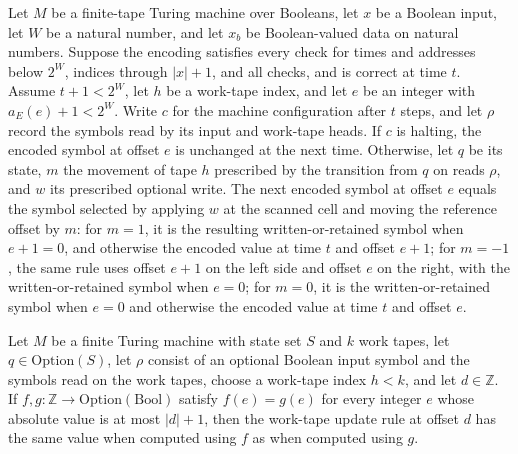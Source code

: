 \begin{theorem}
\label{Complexity.Meyer.work_edge}
\leanok
{}
Let $M$ be a finite-tape Turing machine over Booleans, let $x$ be a Boolean input, let
$W$ be a natural number, and let $x_b$ be Boolean-valued data on natural numbers.
Suppose the encoding satisfies every check for times and addresses below $2^W$, indices
through $|x|+1$, and all checks, and is correct at time $t$. Assume $t+1<2^W$, let $h$
be a work-tape index, and let $e$ be an integer with $a_E(e)+1<2^W$. Write $c$ for the
machine configuration after $t$ steps, and let $\rho$ record the symbols read by its
input and work-tape heads. If $c$ is halting, the encoded symbol at offset $e$ is
unchanged at the next time. Otherwise, let $q$ be its state, $m$ the movement of tape
$h$ prescribed by the transition from $q$ on reads $\rho$, and $w$ its prescribed
optional write. The next encoded symbol at offset $e$ equals the symbol selected by
applying $w$ at the scanned cell and moving the reference offset by $m$: for $m=1$, it
is the resulting written-or-retained symbol when $e+1=0$, and otherwise the encoded
value at time $t$ and offset $e+1$; for $m=-1$, the same rule uses offset $e+1$ on the
left side and offset $e$ on the right, with the written-or-retained symbol when $e=0$;
for $m=0$, it is the written-or-retained symbol when $e=0$ and otherwise the encoded
value at time $t$ and offset $e$.
\end{theorem}

\begin{theorem}
\label{Complexity.Meyer.ruleW_congr}
\leanok
{}
Let $M$ be a finite Turing machine with state set $S$ and $k$ work tapes, let
$q\in\mathrm{Option}(S)$, let $\rho$ consist of an optional Boolean input symbol and the
symbols read on the work tapes, choose a work-tape index $h<k$, and let
$d\in\mathbb{Z}$. If $f,g:\mathbb{Z}\to\mathrm{Option}(\mathrm{Bool})$ satisfy
$f(e)=g(e)$ for every integer $e$ whose absolute value is at most $|d|+1$, then the
work-tape update rule at offset $d$ has the same value when computed using $f$ as when
computed using $g$.
\end{theorem}

